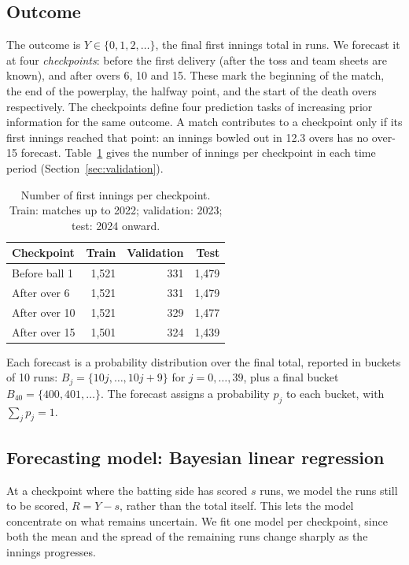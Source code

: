 \documentclass{article}
\newcommand{\1}{\mathbf{1}}
\begin{document}
\subsection{Outcome}
The outcome is $Y \in \{0, 1, 2, \dots\}$, the final first innings total in runs. We forecast it at four \emph{checkpoints}: before the first delivery (after the toss and team sheets are known), and after overs 6, 10 and 15. These mark the beginning of the match, the end of the powerplay, the halfway point, and the start of the death overs respectively. The checkpoints define four prediction tasks of increasing prior information for the same outcome. A match contributes to a checkpoint only if its first innings reached that point: an innings bowled out in 12.3 overs has no over-15 forecast. Table~\ref{tab:counts} gives the number of innings per checkpoint in each time period (Section~\ref{sec:validation}).

\begin{table}[h]
\centering
\caption{Number of first innings per checkpoint. Train: matches up to 2022; validation: 2023; test: 2024 onward.}
\label{tab:counts}
\begin{tabular}{lrrr}
\toprule
Checkpoint & Train & Validation & Test \\
\midrule
Before ball 1 & 1{,}521 & 331 & 1{,}479 \\
After over 6  & 1{,}521 & 331 & 1{,}479 \\
After over 10 & 1{,}521 & 329 & 1{,}477 \\
After over 15 & 1{,}501 & 324 & 1{,}439 \\
\bottomrule
\end{tabular}
\end{table}

Each forecast is a probability distribution over the final total, reported in buckets of 10 runs: $B_j = \{10j, \dots, 10j + 9\}$ for $j = 0, \dots, 39$, plus a final bucket $B_{40} = \{400, 401, \dots\}$. The forecast assigns a probability $p_j$ to each bucket, with $\sum_j p_j = 1$.

\subsection{Forecasting model: Bayesian linear regression}\label{sec:model}
At a checkpoint where the batting side has scored $s$ runs, we model the runs still to be scored, $R = Y - s$, rather than the total itself. This lets the model concentrate on what remains uncertain. We fit one model per checkpoint, since both the mean and the spread of the remaining runs change sharply as the innings progresses.
\end{document}
